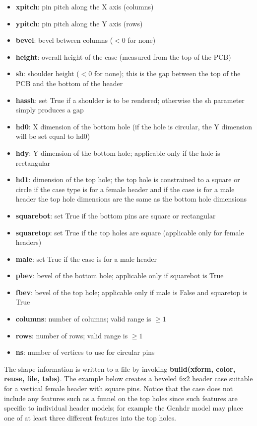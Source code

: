 \begin{itemize}
\item \textbf{xpitch}: pin pitch along the X axis (columns)
\item \textbf{ypitch}: pin pitch along the Y axis (rows)
\item \textbf{bevel}: bevel between columns ($<0$ for none)
\item \textbf{height}: overall height of the case (measured from the top of the PCB)
\item \textbf{sh}: shoulder height ($<0$ for none); this is the gap between the top of the PCB and the bottom of the header
\item \textbf{hassh}: set True if a shoulder is to be rendered; otherwise the sh parameter simply produces a gap
\item \textbf{hd0}: X dimension of the bottom hole (if the hole is circular, the Y dimension will be set equal to hd0)
\item \textbf{hdy}: Y dimension of the bottom hole; applicable only if the hole is rectangular
\item \textbf{hd1}: dimension of the top hole; the top hole is constrained to a square or circle if the case type is
    for a female header and if the case is for a male header the top hole dimensions are the same as the bottom
    hole dimensions
\item \textbf{squarebot}: set True if the bottom pins are square or rectangular
\item \textbf{squaretop}: set True if the top holes are square (applicable only for female headers)
\item \textbf{male}: set True if the case is for a male header
\item \textbf{pbev}: bevel of the bottom hole; applicable only if squarebot is True
\item \textbf{fbev}: bevel of the top hole; applicable only if male is False and squaretop is True
\item \textbf{columns}: number of columns; valid range is $\ge1$
\item \textbf{rows}: number of rows; valid range is $\ge1$
\item \textbf{ns}: number of vertices to use for circular pins
\end{itemize}

The shape information is written to a file by invoking \textbf{build(xform, color, reuse, file, tabs)}.
The example below creates a beveled 6x2 header case suitable for a vertical female header with square pins.
Notice that the case does not include any features such as a funnel on the top holes since such features
are specific to individual header models; for example the Genhdr model may place one of at least three
different features into the top holes.

